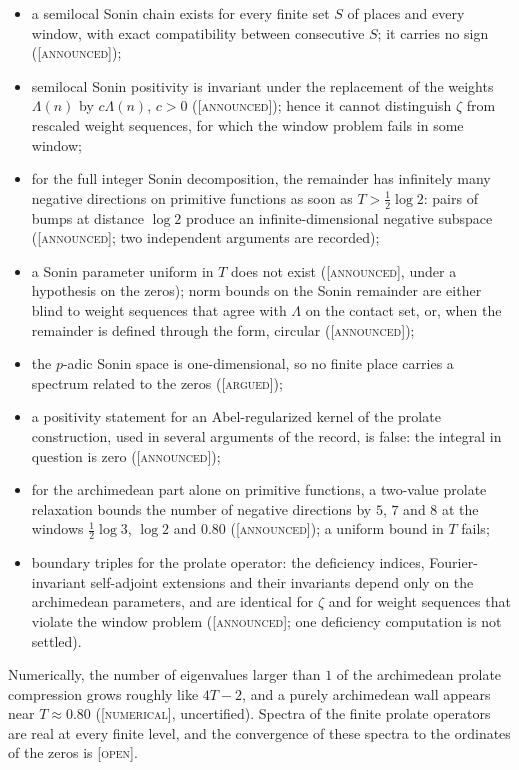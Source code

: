 \documentclass[11pt]{amsart}
\theoremstyle{definition}
\theoremstyle{remark}
\numberwithin{equation}{section}
\newcommand{\stag}[1]{\textsc{[#1]}}
\newcommand{\ARGUED}{\stag{argued}}
\newcommand{\NUM}{\stag{numerical}}
\newcommand{\OPENQ}{\stag{open}}
\newcommand{\ANNOUNCED}{\stag{announced}}
\begin{document}
\begin{itemize}[leftmargin=2em]
\item a semilocal Sonin chain exists for every finite set $S$ of places and every window, with exact
  compatibility between consecutive $S$; it carries no sign (\ANNOUNCED);
\item semilocal Sonin positivity is invariant under the replacement of the weights $\Lambda(n)$ by
  $c\Lambda(n)$, $c>0$ (\ANNOUNCED); hence it cannot distinguish $\zeta$ from rescaled weight
  sequences, for which the window problem fails in some window;
\item for the full integer Sonin decomposition, the remainder has infinitely many negative directions
  on primitive functions as soon as $T>\frac12\log2$: pairs of bumps at distance $\log2$ produce an
  infinite-dimensional negative subspace (\ANNOUNCED; two independent arguments are recorded);
\item a Sonin parameter uniform in $T$ does not exist (\ANNOUNCED, under a hypothesis on the zeros);
  norm bounds on the Sonin remainder are either blind to weight sequences that agree with $\Lambda$
  on the contact set, or, when the remainder is defined through the form, circular (\ANNOUNCED);
\item the $p$-adic Sonin space is one-dimensional, so no finite place carries a spectrum related to
  the zeros (\ARGUED);
\item a positivity statement for an Abel-regularized kernel of the prolate construction, used in
  several arguments of the record, is false: the integral in question is zero (\ANNOUNCED);
\item for the archimedean part alone on primitive functions, a two-value prolate relaxation bounds
  the number of negative directions by $5$, $7$ and $8$ at the windows $\frac12\log3$, $\log2$ and
  $0.80$ (\ANNOUNCED); a uniform bound in $T$ fails;
\item boundary triples for the prolate operator: the deficiency indices, Fourier-invariant
  self-adjoint extensions and their invariants depend only on the archimedean parameters, and are
  identical for $\zeta$ and for weight sequences that violate the window problem (\ANNOUNCED; one
  deficiency computation is not settled).
\end{itemize}
Numerically, the number of eigenvalues larger than $1$ of the archimedean prolate compression grows
roughly like $4T-2$, and a purely archimedean wall appears near $T\approx0.80$ (\NUM, uncertified).
Spectra of the finite prolate operators are real at every finite level, and the convergence of
these spectra to the ordinates of the zeros is \OPENQ.
\end{document}
